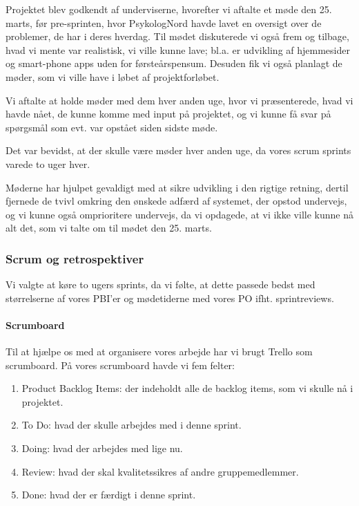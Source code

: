 Projektet blev godkendt af underviserne, hvorefter vi aftalte et møde den 25. marts, før pre-sprinten, hvor PsykologNord havde lavet en oversigt over de problemer, de har i deres hverdag.
Til mødet diskuterede vi også frem og tilbage, hvad vi mente var realistisk, vi ville kunne lave; bl.a. er udvikling af hjemmesider og smart-phone apps uden for førsteårspensum.
Desuden fik vi også planlagt de møder, som vi ville have i løbet af projektforløbet.

Vi aftalte at holde møder med dem hver anden uge, hvor vi præsenterede, hvad vi havde nået, de kunne komme med input på projektet, og vi kunne få svar på spørgsmål som evt. var opstået siden sidste møde.

Det var bevidst, at der skulle være møder hver anden uge, da vores scrum sprints varede to uger hver.

Møderne har hjulpet gevaldigt med at sikre udvikling i den rigtige retning, dertil fjernede de tvivl omkring den ønskede adfærd af systemet, der opstod undervejs, og vi kunne også omprioritere undervejs, da vi opdagede, at vi ikke ville kunne nå alt det, som vi talte om til mødet den 25. marts.



\subsubsection{Scrum og retrospektiver}

Vi valgte at køre to ugers sprints, da vi følte, at dette passede bedst med størrelserne af vores PBI'er og mødetiderne med vores PO ifht. sprintreviews.

\paragraph*{Scrumboard}
Til at hjælpe os med at organisere vores arbejde har vi brugt Trello som scrumboard.
På vores scrumboard havde vi fem felter:
\begin{enumerate}
    \item Product Backlog Items: der indeholdt alle de backlog items, som vi skulle nå i projektet.
    \item To Do: hvad der skulle arbejdes med i denne sprint.
    \item Doing: hvad der arbejdes med lige nu.
    \item Review: hvad der skal kvalitetssikres af andre gruppemedlemmer.
    \item Done: hvad der er færdigt i denne sprint.
\end{enumerate}

